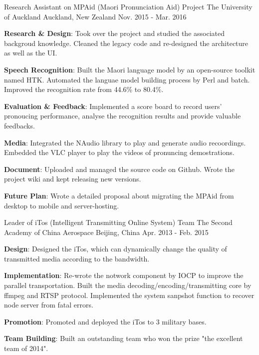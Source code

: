 
\newcommand{\cvitem}[2]{\item\small{\textbf{#1}{: #2 \vspace{-2pt}}}}



\begin{cventries}


\cventry
{Research Assistant on MPAid (Maori Pronunciation Aid) Project} %
{The University of Auckland} %
{Auckland, New Zealand} %
{Nov. 2015 - Mar. 2016} %
{ %
\begin{cvitems}
\cvitem {Research \& Design}
{Took over the project and studied the associated backgroud knowledge. Cleaned the legacy code and re-designed the architecture as well as the UI.}
\cvitem {Speech Recognition}
{Built the Maori language model by an open-source toolkit named HTK. Automated the languae model building process by Perl and batch. Improved the recognition rate from 44.6\% to 80.4\%.}
\cvitem {Evaluation \& Feedback}
{Implemented a score board to record users' pronoucing performance, analyse the recognition results and provide valuable feedbacks.}
\cvitem {Media}
{Integrated the NAudio library to play and generate audio recoordings. Embedded the VLC player to play the videos of pronuncing demostrations.}
\cvitem {Document}
{Uploaded and managed the source code on Github. Wrote the project wiki and  kept releasing new versions.}
\cvitem {Future Plan}
{Wrote a detailed proposal about migrating the MPAid from desktop to mobile and server-hosting.}
\end{cvitems}
}


\cventry
{Leader of iTos (Intelligent Transmitting Online System) Team} %
{The Second Academy of China Aerospace} %
{Beijing, China} %
{Apr. 2013 - Feb. 2015} %
{ %
\begin{cvitems}
\cvitem {Design}
{Designed the iTos, which can dynamically change the quality of transmitted media according to the bandwidth.}
\cvitem {Implementation}
{Re-wrote the notwork component by IOCP to improve the parallel transportation. Built the media decoding/encoding/transmitting core by ffmpeg and RTSP protocol. Implemented the system sanpshot function to recover node server from fatal errors.}
\cvitem {Promotion}
{Promoted and deployed the iTos to 3 military bases.}
\cvitem {Team Building}
{Built an outstanding team who won the prize "the excellent team of 2014".}
\end{cvitems}
}


\end{cventries}

